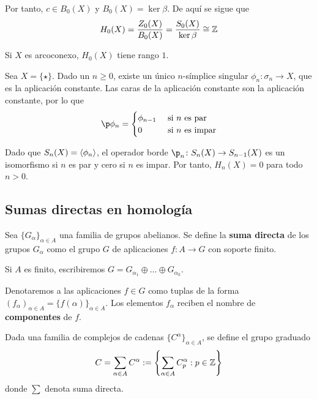 Por tanto, $c \in B_0(X)$ y $B_0(X)=\ker \beta$.
De aquí se sigue que
	\[H_0(X)=\frac{Z_0(X)}{B_0(X)}=\frac{S_0(X)}{\ker \beta} \cong \mathbb{Z}\]

\begin{proposition}
	Si $X$ es arcoconexo, $H_0(X)$ tiene rango $1$.
\end{proposition}

\begin{example}
	Sea $X=\{\star\}$.
	Dado un $n \geq 0$, existe un único $n$-símplice singular $\phi_n\colon\sigma_n \to X$, que es la aplicación constante.
	Las caras de la aplicación constante son la aplicación constante, por lo que
	\begin{align*}
	\p\phi_n=
		\begin{cases}
		\phi_{n-1}	&\mbox{ si }n\mbox{ es par}\\
		0          	&\mbox{ si }n\mbox{ es impar}
		\end{cases}
	\end{align*}

	Dado que $S_n(X)=\left\langle \phi_n\right\rangle$, el operador borde $\p_n\colon S_n(X) \to S_{n-1}(X)$ es un isomorfismo si $n$ es par y cero si $n$ es impar.
	Por tanto, $H_n(X)=0$ para todo $n > 0$.
\end{example}

\subsection{Sumas directas en homología}
\begin{definition}
	Sea $\{G_\alpha\}_{\alpha \in A}$ una familia de grupos abelianos.
	Se define la \textbf{suma directa} de los grupos $G_\alpha$ como el grupo $G$ de aplicaciones $f\colon A \to G$ con soporte finito.

	Si $A$ es finito, escribiremos $G=G_{\alpha_1}\oplus \dots \oplus G_{\alpha_k}$.
\end{definition}

Denotaremos a las aplicaciones $f \in G$ como tuplas de la forma $(f_\alpha)_{\alpha \in A}=\{f(\alpha)\}_{\alpha \in A}$.
Los elementos $f_\alpha$ reciben el nombre de \textbf{componentes} de $f$.

Dada una familia de complejos de cadenas $\{C^\alpha\}_{\alpha \in A}$, se define el grupo graduado
	\[C=\sum_{\alpha \in A}C^\alpha:=\left\{\sum_{\alpha \in A}C^\alpha_p: p \in \mathbb{Z}\right\}\]
donde $\sum$ denota suma directa.

